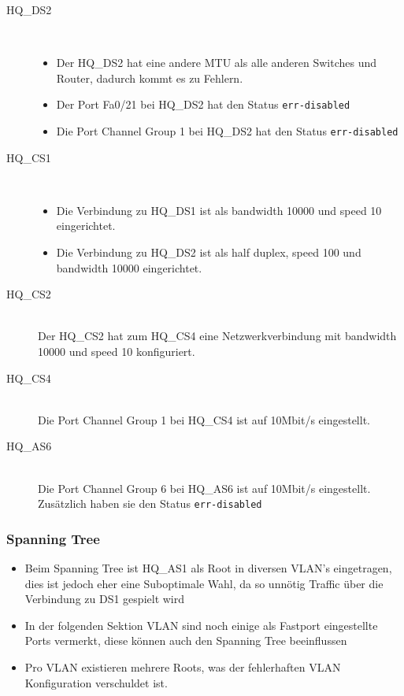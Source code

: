 \begin{description}
	\item[HQ\_DS2] \hfill \\
	  \begin{itemize}
	    \item Der HQ\_DS2 hat eine andere MTU als alle anderen Switches und Router, dadurch kommt es zu Fehlern.
	    \item Der Port Fa0/21 bei HQ\_DS2 hat den Status \lstinline|err-disabled|
	    \item Die Port Channel Group 1 bei HQ\_DS2 hat den Status \lstinline|err-disabled|
          \end{itemize}
	\item[HQ\_CS1] \hfill \\
		\begin{itemize}
			\item Die Verbindung zu HQ\_DS1 ist als bandwidth 10000 und speed 10 eingerichtet.
			\item Die Verbindung zu HQ\_DS2 ist als half duplex, speed 100 und bandwidth 10000 eingerichtet.
		\end{itemize}
	\item[HQ\_CS2] \hfill \\
	 Der HQ\_CS2 hat zum HQ\_CS4 eine Netzwerkverbindung mit bandwidth 10000 und speed 10 konfiguriert.
	\item[HQ\_CS4] \hfill \\
		Die Port Channel Group 1 bei HQ\_CS4 ist auf 10Mbit/s eingestellt. 
	\item[HQ\_AS6] \hfill \\
		Die Port Channel Group 6 bei HQ\_AS6 ist auf 10Mbit/s eingestellt. Zusätzlich haben sie den Status \lstinline|err-disabled|
\end{description}

\subsubsection{Spanning Tree}
\begin{itemize}
	\item Beim Spanning Tree ist HQ\_AS1 als Root in diversen VLAN's eingetragen, dies ist jedoch eher eine Suboptimale Wahl, da so unnötig Traffic über die Verbindung zu DS1 gespielt wird
	\item In der folgenden Sektion VLAN sind noch einige als Fastport eingestellte Ports vermerkt, diese können auch den Spanning Tree beeinflussen
	\item Pro VLAN existieren mehrere Roots, was der fehlerhaften VLAN Konfiguration verschuldet ist.
\end{itemize}

